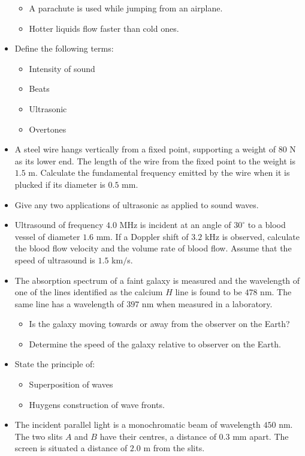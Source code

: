\documentclass{article}
\begin{document}
\begin{itemize}
\begin{itemize}
\item A parachute is used while jumping from an airplane.
\item Hotter liquids flow faster than cold ones.
\end{itemize}
\item Define the following terms:
 \begin{itemize}
\item Intensity of sound
\item Beats
\item Ultrasonic
\item Overtones
\end{itemize}
\item A steel wire hangs vertically from a fixed point, supporting a weight of $ 80$ N as its lower end.  The length of the wire from the fixed point to the weight is $ 1.5$ m.  Calculate the fundamental frequency emitted by the wire when it is plucked if its diameter is $ 0.5$ mm. 
\item Give any two applications of ultrasonic as applied to sound waves.
\item Ultrasound of frequency $ 4.0$ MHz is incident at an angle of $ 30^{\circ}$ to a blood vessel of diameter $ 1.6$ mm.  If a Doppler shift of $ 3.2$ kHz is observed, calculate the blood flow velocity and the volume rate of blood flow.  Assume that the speed of ultrasound is $ 1.5$ km$/$s.
\item The absorption spectrum of a faint galaxy is measured and the wavelength of one of the lines identified as the calcium $ H$ line is found to be $ 478$ nm.  The same line has a wavelength of $ 397$ nm when measured in a laboratory. 
 \begin{itemize}
\item Is the galaxy moving towards or away from the observer on the Earth?
\item Determine the speed of the galaxy relative to observer on the Earth.
\end{itemize}
\item State the principle of:
 \begin{itemize}
\item Superposition of waves
\item Huygens construction of wave fronts.
\end{itemize}
\item The incident parallel light is a monochromatic beam of wavelength $ 450$ nm.  The two slits $ A$ and $ B$ have their centres, a distance of $ 0.3$ mm apart.  The screen is situated a distance of $ 2.0$ m from the slits.

\end{itemize}
\end{document}
